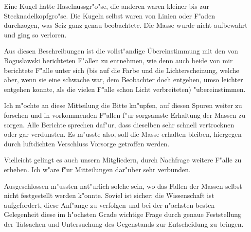 \documentclass[a4paper, 11pt, oneside, german]{article}
\begin{document}
Eine Kugel hatte Haselnussgr"o"se, die anderen waren kleiner bis zur Stecknadelkopfgro"se. Die Kugeln selbst waren von Linien oder F"aden durchzogen, was Seiz ganz genau beobachtete. Die Masse wurde nicht aufbewahrt und ging so verloren.

Aus diesen Beschreibungen ist die vollst"andige Übereinstimmung mit den von Boguslawski berichteten F"allen zu entnehmen, wie denn auch beide von mir berichtete F"alle unter sich (bis auf die Farbe und die Lichterscheinung, welche aber, wenn sie eine schwache war, dem Beobachter doch entgehen, umso leichter entgehen konnte, als die vielen F"alle schon Licht verbreiteten) "ubereinstimmen.

Ich m"ochte an diese Mitteilung die Bitte kn"upfen, auf diesen Spuren weiter zu forschen und in vorkommenden F"allen f"ur sorgsamste Erhaltung der Massen zu sorgen. Alle Berichte sprechen daf"ur, dass dieselben sehr schnell vertrocknen oder gar verdunsten. Es m"usste also, soll die Masse erhalten bleiben, hiergegen durch luftdichten Verschluss Vorsorge getroffen werden.

Vielleicht gelingt es auch unsern Mitgliedern, durch Nachfrage weitere F"alle zu erheben. Ich w"are f"ur Mitteilungen dar"uber sehr verbunden.

Ausgeschlossen m"ussten nat"urlich solche sein, wo das Fallen der Massen selbst nicht festgestellt werden k"onnte. Soviel ist sicher: die Wissenschaft ist aufgefordert, diese Anf"ange zu verfolgen und bei der n"achsten besten Gelegenheit diese im h"ochsten Grade wichtige Frage durch genaue Feststellung der Tatsachen und Untersuchung des Gegenstands zur Entscheidung zu bringen.
\clearpage
\end{document}
